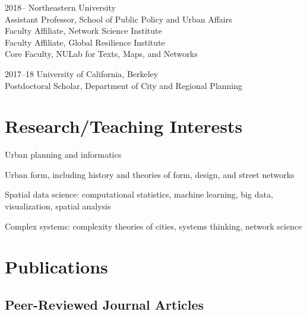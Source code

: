 \documentclass[12pt,letterpaper]{report}
\newcommand{\listitemspace}{0.15em}
\renewenvironment{itemize}
{\begin{list}{}{\setlength{\leftmargin}{0em}
				\setlength{\parskip}{0em}
				\setlength{\itemsep}{\listitemspace}
				\setlength{\parsep}{\listitemspace}}}
{\end{list}}
\begin{document}
\begin{tablist}                     

\item[2018--]   \tab Northeastern University \\
				Assistant Professor, School of Public Policy and Urban Affairs \\
		        Faculty Affiliate, Network Science Institute \\
		        Faculty Affiliate, Global Resilience Institute \\
		        Core Faculty, NULab for Texts, Maps, and Networks
			    

\item[2017--18] \tab University of California, Berkeley \\
				Postdoctoral Scholar, Department of City and Regional Planning
                

\end{tablist}



\section*{Research/Teaching Interests}

\begin{itemize}
	
\item Urban planning and informatics

\item Urban form, including history and theories of form, design, and street networks

\item Spatial data science: computational statistics, machine learning, big data, visualization, spatial analysis

\item Complex systems: complexity theories of cities, systems thinking, network science

\end{itemize}



\section*{Publications}

\subsection*{Peer-Reviewed Journal Articles}
\end{document}
